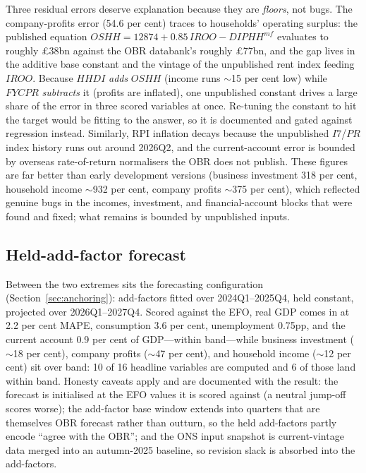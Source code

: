 Three residual errors deserve explanation because they are \emph{floors}, not bugs. The company-profits error (54.6 per cent) traces to households' operating surplus: the published equation $OSHH = 12874 + 0.85\,IROO - DIPHH^{mf}$ evaluates to roughly \pounds 38bn against the OBR databank's roughly \pounds 77bn, and the gap lives in the additive base constant and the vintage of the unpublished rent index feeding $IROO$. Because $HHDI$ \emph{adds} $OSHH$ (income runs $\sim$15 per cent low) while $FYCPR$ \emph{subtracts} it (profits are inflated), one unpublished constant drives a large share of the error in three scored variables at once. Re-tuning the constant to hit the target would be fitting to the answer, so it is documented and gated against regression instead. Similarly, RPI inflation decays because the unpublished $I7$/$PR$ index history runs out around 2026Q2, and the current-account error is bounded by overseas rate-of-return normalisers the OBR does not publish. These figures are far better than early development versions (business investment 318 per cent, household income $\sim$932 per cent, company profits $\sim$375 per cent), which reflected genuine bugs in the incomes, investment, and financial-account blocks that were found and fixed; what remains is bounded by unpublished inputs.

\subsection{Held-add-factor forecast}

Between the two extremes sits the forecasting configuration (Section~\ref{sec:anchoring}): add-factors fitted over 2024Q1--2025Q4, held constant, projected over 2026Q1--2027Q4. Scored against the EFO, real GDP comes in at 2.2 per cent MAPE, consumption 3.6 per cent, unemployment 0.75pp, and the current account 0.9 per cent of GDP---within band---while business investment ($\sim$18 per cent), company profits ($\sim$47 per cent), and household income ($\sim$12 per cent) sit over band: 10 of 16 headline variables are computed and 6 of those land within band. Honesty caveats apply and are documented with the result: the forecast is initialised at the EFO values it is scored against (a neutral jump-off scores worse); the add-factor base window extends into quarters that are themselves OBR forecast rather than outturn, so the held add-factors partly encode ``agree with the OBR''; and the ONS input snapshot is current-vintage data merged into an autumn-2025 baseline, so revision slack is absorbed into the add-factors.
